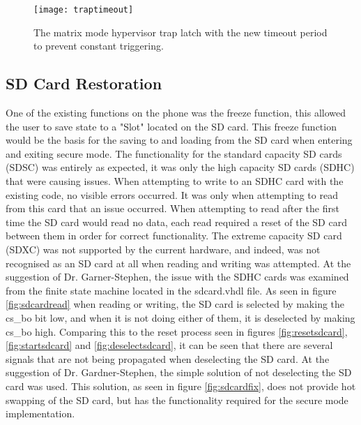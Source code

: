 \begin{figure}
  \centering
  \texttt{[image: traptimeout]}
  \caption{The matrix mode hypervisor trap latch with the new timeout period to prevent constant triggering.}
  \label{fig:traptimeout}
\end{figure}

\subsection{SD Card Restoration}

\label{Ch6 Sec2 Sub2}

One of the existing functions on the phone was the freeze function, this allowed the user to save state to a "Slot" located on the SD card. This freeze function would be the basis for the saving to and loading from the SD card when entering and exiting secure mode. The functionality for the standard capacity SD cards (SDSC) was entirely as expected, it was only the high capacity SD cards (SDHC) that were causing issues. When attempting to write to an SDHC card with the existing code, no visible errors occurred. It was only when attempting to read from this card that an issue occurred. When attempting to read after the first time the SD card would read no data, each read required a reset of the SD card between them in order for correct functionality. The extreme capacity SD card (SDXC) was not supported by the current hardware, and indeed, was not recognised as an SD card at all when reading and writing was attempted. At the suggestion of Dr. Garner-Stephen, the issue with the SDHC cards was examined from the finite state machine located in the sdcard.vhdl file. As seen in figure \ref{fig:sdcardread} when reading or writing, the SD card is selected by making the cs\_bo bit low, and when it is not doing either of them, it is deselected by making cs\_bo high. Comparing this to the reset process seen in figures \ref{fig:resetsdcard}, \ref{fig:startsdcard} and \ref{fig:deselectsdcard}, it can be seen that there are several signals that are not being propagated when deselecting the SD card. At the suggestion of Dr. Gardner-Stephen, the simple solution of not deselecting the SD card was used. This solution, as seen in figure \ref{fig:sdcardfix}, does not provide hot swapping of the SD card, but has the functionality required for the secure mode implementation.\\

